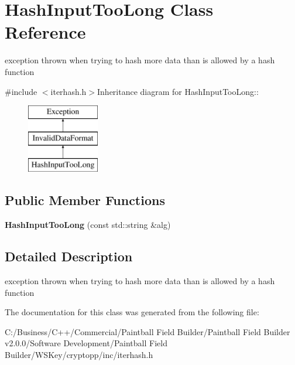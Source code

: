 \hypertarget{class_hash_input_too_long}{
\section{HashInputTooLong Class Reference}
\label{class_hash_input_too_long}
}


exception thrown when trying to hash more data than is allowed by a hash function  


{\ttfamily \#include $<$iterhash.h$>$}Inheritance diagram for HashInputTooLong::\begin{figure}[H]
\begin{center}
\leavevmode
\includegraphics[height=3cm]{class_hash_input_too_long}
\end{center}
\end{figure}
\subsection*{Public Member Functions}
\begin{DoxyCompactItemize}
\item 
\hypertarget{class_hash_input_too_long_ab4437de498d6a4f082d7ae2d23b663d8}{
{\bfseries HashInputTooLong} (const std::string \&alg)}
\label{class_hash_input_too_long_ab4437de498d6a4f082d7ae2d23b663d8}

\end{DoxyCompactItemize}


\subsection{Detailed Description}
exception thrown when trying to hash more data than is allowed by a hash function 

The documentation for this class was generated from the following file:\begin{DoxyCompactItemize}
\item 
C:/Business/C++/Commercial/Paintball Field Builder/Paintball Field Builder v2.0.0/Software Development/Paintball Field Builder/WSKey/cryptopp/inc/iterhash.h\end{DoxyCompactItemize}

